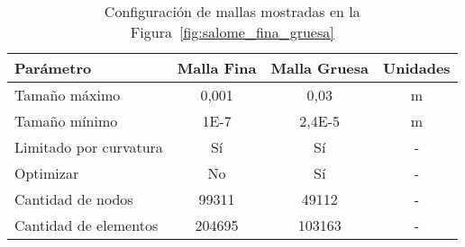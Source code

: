 \begin{table}
    \centering
    \begin{tabular}{lccc} \toprule
        Parámetro                & Malla Fina    & Malla Gruesa     & Unidades\\ \midrule
        Tamaño máximo            & 0,001         & 0,03             & m \\
        Tamaño mínimo            & 1E-7          & 2,4E-5           & m \\
        Limitado por curvatura   & Sí            & Sí               & - \\
        Optimizar                & No            & Sí               & - \\
        Cantidad de nodos        & 99311         & 49112            & - \\
        Cantidad de elementos    & 204695        & 103163           & - \\ \bottomrule
    \end{tabular}
    \caption{Configuración de mallas mostradas en la Figura~\ref{fig:salome_fina_gruesa}}
    \label{tab:salome_fina_gruesa}
\end{table}
